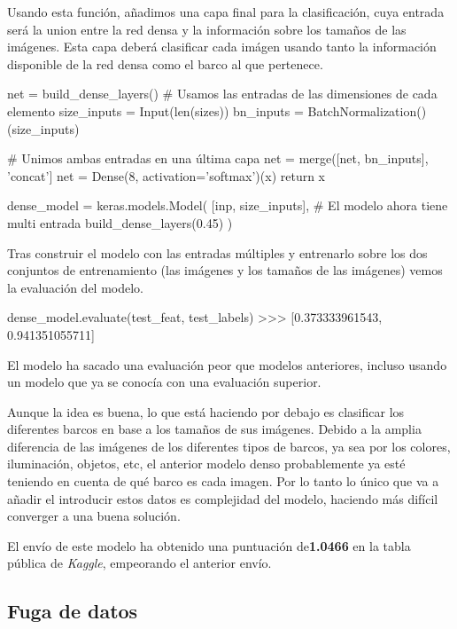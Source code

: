 Usando esta función, añadimos una capa final para la clasificación, cuya entrada
será la union entre la red densa y la información sobre los tamaños de las
imágenes. Esta capa deberá clasificar cada imágen usando tanto la información
disponible de la red densa como el barco al que pertenece.

\begin{python}
net = build_dense_layers()
# Usamos las entradas de las dimensiones de cada elemento
size_inputs = Input(len(sizes))
bn_inputs = BatchNormalization()(size_inputs)

# Unimos ambas entradas en una última capa
net = merge([net, bn_inputs], 'concat']
net = Dense(8, activation='softmax')(x)
return x


dense_model = keras.models.Model(
    [inp, size_inputs],  # El modelo ahora tiene multi entrada
    build_dense_layers(0.45)
)
\end{python}

Tras construir el modelo con las entradas múltiples y entrenarlo sobre los dos conjuntos de entrenamiento (las imágenes y los tamaños de las imágenes) vemos la evaluación del modelo.

\begin{python}
dense_model.evaluate(test_feat, test_labels)
>>> [0.373333961543, 0.941351055711]
\end{python}

El modelo ha sacado una evaluación peor que modelos anteriores, incluso usando un modelo que ya se conocía con una evaluación superior.

Aunque la idea es buena, lo que está haciendo por debajo es clasificar los
diferentes barcos en base a los tamaños de sus imágenes. Debido a la amplia
diferencia de las imágenes de los diferentes tipos de barcos, ya sea por los
colores, iluminación, objetos, etc, el anterior modelo denso probablemente ya
esté teniendo en cuenta de qué barco es cada imagen. Por lo tanto lo único que
va a añadir el introducir estos datos es complejidad del modelo, haciendo más
difícil converger a una buena solución.

El envío de este modelo ha obtenido una puntuación de\textbf{1.0466} en la tabla pública de \textit{Kaggle}, empeorando el anterior envío.



\subsection{Fuga de datos}

